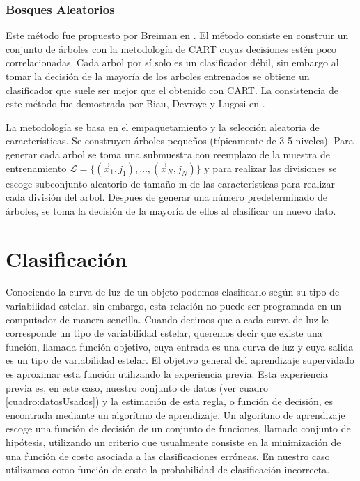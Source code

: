 \documentclass[letterpaper,12pt]{book}
\begin{document}
\subsection{Bosques Aleatorios}

Este método fue propuesto por Breiman en \cite{breiman_random_2001}. El método consiste en construir un conjunto de árboles con la metodología de CART cuyas decisiones estén poco correlacionadas. Cada arbol por sí solo es un clasificador débil, sin embargo al tomar la decisión de la mayoría de los arboles entrenados se obtiene un clasificador que suele ser mejor que el obtenido con CART. La consistencia de este método fue demostrada por Biau, Devroye y Lugosi en \cite{biau_consistency_2008}.

La metodología se basa en el empaquetamiento y la selección aleatoria de características. Se construyen árboles pequeños (típicamente de 3-5 niveles). Para generar cada arbol se toma una submuestra con reemplazo de la muestra de entrenamiento $\mathcal{L}=\{(\vec{x}_1,j_1),\dots,(\vec{x}_N,j_N)\}$ y para realizar las divisiones se escoge subconjunto aleatorio de tamaño m de las características  para realizar cada división del arbol. Despues de generar una número predeterminado de árboles, se toma la decisión de la mayoría de ellos al clasificar un nuevo dato.




\chapter{Clasificación}\label{cap:clasificacion} 

Conociendo la curva de luz de un objeto podemos clasificarlo según su tipo de variabilidad estelar, sin embargo, esta relación no puede ser programada en un computador de manera sencilla. Cuando decimos que a cada curva de luz le corresponde un tipo de variabilidad estelar, queremos decir que existe una función, llamada función objetivo, cuya entrada es una curva de luz y cuya salida es un tipo de variabilidad estelar. El objetivo general del aprendizaje supervidado es aproximar esta función utilizando la experiencia previa. Esta experiencia previa es, en este caso, nuestro conjunto de datos (ver cuadro \ref{cuadro:datosUsados}) y la estimación de esta regla, o función de decisión, es encontrada mediante un algorítmo de aprendizaje. Un algorítmo de aprendizaje escoge una función de decisión de un conjunto de funciones, llamado conjunto de hipótesis, utilizando un criterio que usualmente consiste en la minimización de una función de costo asociada a las clasificaciones erróneas. En nuestro caso utilizamos como función de costo la probabilidad de clasificación incorrecta.
\end{document}
